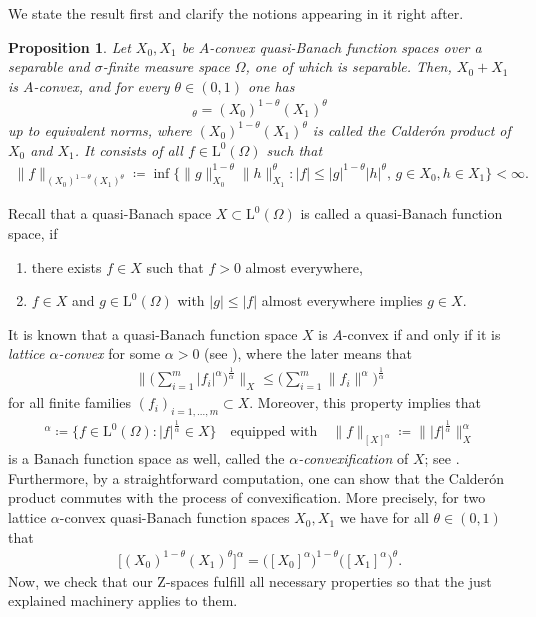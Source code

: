 \documentclass[11pt, leqno,parskip=half]{amsart}
\newtheorem{proposition}[theorem]{Proposition}
\theoremstyle{definition}
\renewcommand{\L}{\mathrm{L}}
\newcommand{\Z}{\mathrm{Z}}
\numberwithin{equation}{section}
\begin{document}
We state the result first and clarify the notions appearing in it right after.

\begin{proposition}
\label{prop: egert-kosmala}
    Let $X_0, X_1$ be $A$-convex quasi-Banach function spaces over a separable and $\sigma$-finite measure space $\Omega$, one of which is separable. Then, $X_0 + X_1$ is $A$-convex, and for every $\theta\in(0,1)$ one has
    \begin{align*}
        [X_0,X_1]_\theta = (X_0)^{1-\theta}(X_1)^\theta
    \end{align*}
    up to equivalent norms, where $(X_0)^{1-\theta}(X_1)^\theta$ is called the Calderón product of $X_0$ and $X_1$. It consists of all $f\in \L^0(\Omega)$ such that
    \begin{align*}
        \|f\|_{(X_0)^{1-\theta}(X_1)^\theta} \coloneqq \inf \Big\{\|g\|_{X_0}^{1-\theta} \|h\|_{X_1}^{\theta}: |f|\leq |g|^{1-\theta} |h|^\theta, \, g\in X_0 , h\in X_1 \Big\}<\infty.
    \end{align*}
\end{proposition}
Recall that a quasi-Banach space $X\subset \L^0(\Omega)$ is called a quasi-Banach function space, if
    \begin{enumerate}
        \item there exists $f\in X$ such that $f>0$ almost everywhere,

        \item $f\in X$ and $g\in \L^0(\Omega)$ with $|g|\leq |f|$ almost everywhere implies $g\in X$.
    \end{enumerate}
It is known that a quasi-Banach function space $X$ is $A$-convex if and only if it is \emph{lattice $\alpha$-convex} for some $\alpha>0$ (see \cite[Thm.\@ 7.8]{Kalton_Mayboroda_Mitrea}), where the later means that
\begin{align*}
    \Big\|\Big(\sum\limits_{i=1}^m |f_i|^\alpha \Big)^\frac{1}{\alpha} \Big\|_{X} \leq \Big(\sum\limits_{i=1}^m \|f_i\|^\alpha \Big)^\frac{1}{\alpha}
\end{align*}
for all finite families $(f_i)_{i=1,\dots, m} \subset X$. Moreover, this property implies that
\begin{align*}
    [X]^\alpha \coloneqq \{f\in \L^0(\Omega): |f|^\frac{1}{\alpha}\in X\}\quad \text{equipped with} \quad \|f\|_{[X]^\alpha} \coloneqq \||f|^\frac{1}{\alpha} \|_X^\alpha
\end{align*}
is a Banach function space as well, called the \emph{$\alpha$-convexification} of $X$; see \cite[Prop.\@ 3.23]{Kosmala}. Furthermore, by a straightforward computation, one can show that the Calderón product commutes with the process of convexification. More precisely, for two lattice $\alpha$-convex quasi-Banach function spaces $X_0,X_1$ we have for all $\theta\in (0,1)$ that
\begin{align}
\label{eq: commutation}
    \big[(X_0)^{1-\theta}(X_1)^\theta \big]^\alpha = \big([X_0]^\alpha\big)^{1-\theta} \big([X_1]^\alpha \big)^\theta.
\end{align}
Now, we check that our $\Z$-spaces fulfill all necessary properties so that the just explained machinery applies to them.
\end{document}
